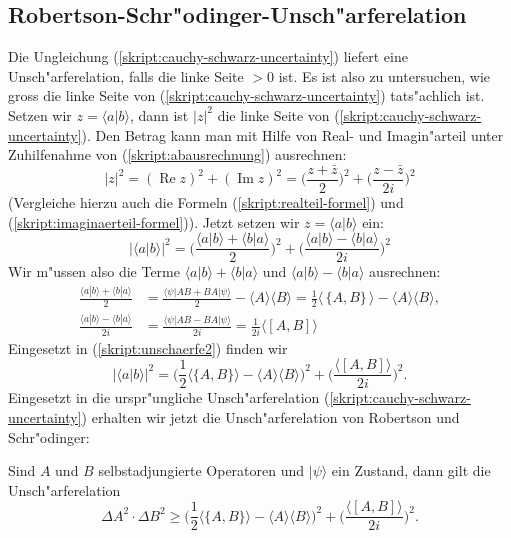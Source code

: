 \subsection{Robertson-Schr"odinger-Unsch"arferelation}
Die Ungleichung (\ref{skript:cauchy-schwarz-uncertainty}) liefert eine
Unsch"arferelation, falls die linke Seite $>0$ ist. Es ist
also zu untersuchen, wie gross die linke Seite von 
(\ref{skript:cauchy-schwarz-uncertainty}) tats"achlich ist.
Setzen wir $z=\langle a|b\rangle$, dann ist $|z|^2$ die linke Seite
von (\ref{skript:cauchy-schwarz-uncertainty}). Den Betrag kann man mit Hilfe
von Real- und Imagin"arteil unter Zuhilfenahme von (\ref{skript:abausrechnung})
ausrechnen:
\[
|z|^2
=
(\operatorname{Re}z)^2+(\operatorname{Im}z)^2
=
\biggl(\frac{z+\bar z}2\biggr)^2 + \biggl(\frac{z-\bar z}{2i}\biggr)^2
\]
(Vergleiche hierzu auch die Formeln (\ref{skript:realteil-formel}) und 
(\ref{skript:imaginaerteil-formel})).
Jetzt setzen wir $z=\langle a|b\rangle$ ein:
\begin{equation}
|\langle a|b\rangle|^2
=
\biggl(\frac{\langle a|b\rangle + \langle b|a\rangle}2\biggr)^2
+
\biggl(\frac{\langle a|b\rangle - \langle b|a\rangle}{2i}\biggr)^2
\label{skript:unschaerfe2}
\end{equation}
Wir m"ussen also die Terme $\langle a|b\rangle + \langle b|a\rangle$
und $\langle a|b\rangle - \langle b|a\rangle$ ausrechnen:
\begin{align*}
\frac{\langle a|b\rangle + \langle b|a\rangle}2
&=
\frac{
\langle\psi|AB+BA|\psi\rangle 
}2
-\langle A\rangle\langle B\rangle
=
\frac12 \langle\,\{A,B\}\,\rangle - \langle A\rangle\langle B\rangle,
\\
\frac{\langle a|b\rangle - \langle b|a\rangle}{2i}
&=
\frac{\langle\psi|AB-BA|\psi\rangle}{2i}
=
\frac1{2i}\langle [A,B]\rangle
\end{align*}
Eingesetzt in (\ref{skript:unschaerfe2}) finden wir
\[
|\langle a|b\rangle|^2
=
\biggl(
\frac12\langle \{A,B\}\rangle - \langle A\rangle\langle B\rangle
\biggr)^2
+
\biggl(
\frac{\langle[A,B]\rangle}{2i}
\biggr)^2.
\]
Eingesetzt in die urspr"ungliche Unsch"arferelation
(\ref{skript:cauchy-schwarz-uncertainty}) erhalten wir jetzt die Unsch"arferelation
von Robertson und Schr"odinger:

\begin{satz}
\label{skript:robertson-schroedinger-unschaerfe}
Sind $A$ und $B$ selbstadjungierte Operatoren und $|\psi\rangle$ ein
Zustand, dann gilt die Unsch"arferelation
\begin{equation}
\Delta A^2\cdot\Delta B^2\ge 
\biggl(
\frac12\langle \{A,B\}\rangle - \langle A\rangle\langle B\rangle
\biggr)^2
+
\biggl(
\frac{\langle[A,B]\rangle}{2i}
\biggr)^2.
\label{skript:uncertainty}
\end{equation}
\end{satz}

